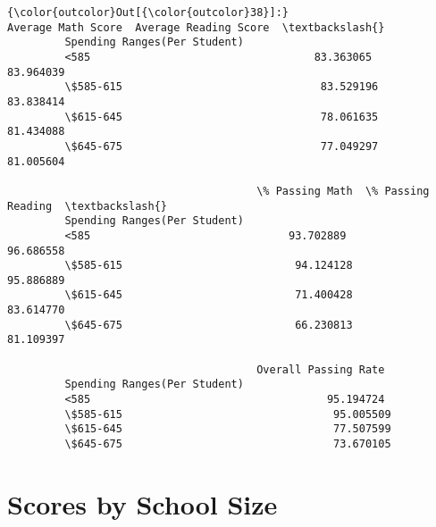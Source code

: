 \documentclass[11pt]{article}
\begin{document}
\begin{Verbatim}[commandchars=\\\{\}]
{\color{outcolor}Out[{\color{outcolor}38}]:}                               Average Math Score  Average Reading Score  \textbackslash{}
         Spending Ranges(Per Student)                                              
         <585                                   83.363065              83.964039   
         \$585-615                               83.529196              83.838414   
         \$615-645                               78.061635              81.434088   
         \$645-675                               77.049297              81.005604   
         
                                       \% Passing Math  \% Passing Reading  \textbackslash{}
         Spending Ranges(Per Student)                                      
         <585                               93.702889          96.686558   
         \$585-615                           94.124128          95.886889   
         \$615-645                           71.400428          83.614770   
         \$645-675                           66.230813          81.109397   
         
                                       Overall Passing Rate  
         Spending Ranges(Per Student)                        
         <585                                     95.194724  
         \$585-615                                 95.005509  
         \$615-645                                 77.507599  
         \$645-675                                 73.670105  
\end{Verbatim}
            
    \section{Scores by School Size}\label{scores-by-school-size}
\end{document}
